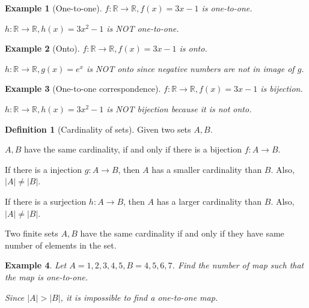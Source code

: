 \documentclass{article}
\theoremstyle{MyNonumberplain}
\theoremstyle{break}
\newcommand{\R}{\mathbb{R}}
\theoremstyle{break}
\newtheorem{example}{Example}[section]
\theoremstyle{break}
\theoremstyle{definition}
\theoremstyle{break}
\newtheorem{definition}{Definition}[section]
\begin{document}
\begin{expbox}
    \begin{example}[One-to-one]
        $f:\R\to\R, f(x)=3x-1$ is one-to-one.\bigskip

        $h:\R\to\R, h(x)=3x^2-1$ is NOT one-to-one.
    \end{example}
\end{expbox}

\begin{expbox}
    \begin{example}[Onto]
        $f:\R\to\R, f(x)=3x-1$ is onto.\bigskip

        $h:\R\to\R, g(x)=e^x$ is NOT onto since negative numbers are not in image of $g$.
    \end{example}
\end{expbox}

\begin{expbox}
    \begin{example}[One-to-one correspondence]
        $f:\R\to\R, f(x)=3x-1$ is bijection.\bigskip

        $h:\R\to\R, h(x)=3x^2-1$ is NOT bijection because it is not onto.
    \end{example}
\end{expbox}

\begin{defbox}
    \begin{definition}[Cardinality of sets]
        Given two sets $A,B$.\bigskip

        $A,B$ have the same cardinality, if and only if there is a bijection $f:A\to B$.\bigskip

        If there is a injection $g:A\to B$, then $A$ has a smaller cardinality than $B$. Also, $|A|\neq |B|$.\bigskip

        If there is a surjection $h:A\to B$, then $A$ has a larger cardinality than $B$. Also, $|A|\neq |B|$.\bigskip

        Two finite sets $A,B$ have the same cardinality if and only if they have same number of elements in the set. 
    \end{definition}
\end{defbox}

\begin{expbox}
    \begin{example}
        Let $A={1,2,3,4,5},B={4,5,6,7}$. Find the number of map such that the map is one-to-one.\bigskip

        Since $|A| > |B|$, it is impossible to find a one-to-one map.    
    \end{example}
\end{expbox}
\end{document}
